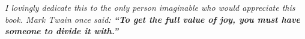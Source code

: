 \thispagestyle{empty}
\vspace*{\fill}
\begin{center}
\Large{\textit{I lovingly dedicate this to the only person imaginable who would appreciate this book.
Mark Twain once said: \textbf{``To get the full value of joy, you must have someone to divide it with.''}}}
\end{center}
\vspace*{\fill}
\clearpage